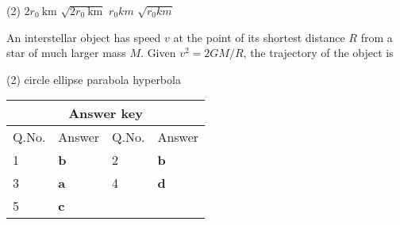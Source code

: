 \begin{enumerate}
\begin{minipage}{\textwidth}
\end{minipage}
\begin{tasks}(2)
	\task[\textbf{A.}] $2 r_{0} \mathrm{~km}$
	\task[\textbf{B.}]$\sqrt{2 r_{0} \mathrm{~km}}$
	\task[\textbf{C.}]$r_{0} k m$
	\task[\textbf{D.}]$\sqrt{r_{0} k m}$
\end{tasks}
\begin{minipage}{\textwidth}
	\item An interstellar object has speed $v$ at the point of its shortest distance $R$ from a star of much larger mass $M$. Given $v^{2}=2 G M / R$, the trajectory of the object is
\end{minipage}
\begin{tasks}(2)
	\task[\textbf{A.}] circle
	\task[\textbf{B.}]ellipse
	\task[\textbf{C.}]parabola
	\task[\textbf{D.}]hyperbola
\end{tasks}
\end{enumerate}
\setlength\arrayrulewidth{1pt}
\begin{table}[H]
	\centering
	
	\begin{tabular}{|p{1.5cm}|p{1.5cm}||p{1.5cm}|p{1.5cm}|}
		\hline
		\multicolumn{4}{|c|}{\textbf{Answer key}}\\\hline\hline
		\rowcolor{ocrel}Q.No.&Answer&Q.No.&Answer\\\hline
		1&\textbf{b}&2&\textbf{b}\\\hline
		3&\textbf{a}&4&\textbf{d}\\\hline
		5&\textbf{c}&&\\\hline
	\end{tabular}
\end{table}